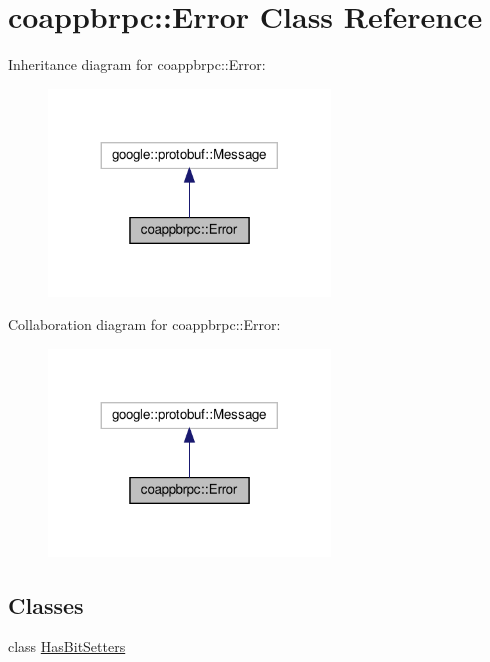 \hypertarget{classcoappbrpc_1_1Error}{}\section{coappbrpc\+:\+:Error Class Reference}
\label{classcoappbrpc_1_1Error}


Inheritance diagram for coappbrpc\+:\+:Error\+:\nopagebreak
\begin{figure}[H]
\begin{center}
\leavevmode
\includegraphics[width=212pt]{classcoappbrpc_1_1Error__inherit__graph}
\end{center}
\end{figure}


Collaboration diagram for coappbrpc\+:\+:Error\+:\nopagebreak
\begin{figure}[H]
\begin{center}
\leavevmode
\includegraphics[width=212pt]{classcoappbrpc_1_1Error__coll__graph}
\end{center}
\end{figure}
\subsection*{Classes}
\begin{DoxyCompactItemize}
\item 
class \hyperlink{classcoappbrpc_1_1Error_1_1HasBitSetters}{Has\+Bit\+Setters}
\end{DoxyCompactItemize}
